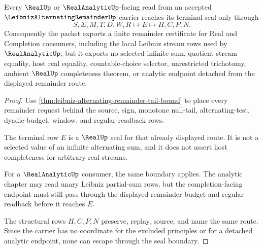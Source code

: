 \begin{theorem}
\label{thm:leibniz-alternating-remainder-real-seal-boundary}
Every $\RealUp$ or $\RealAnalyticUp$-facing read from an accepted $\LeibnizAlternatingRemainderUp$ carrier reaches its terminal seal only through
$$
S,\Sigma,M,T,D,W,R \longmapsto E \longmapsto H,C,P,N .
$$
Consequently the packet exports a finite remainder certificate for Real and Completion consumers, including the local Leibniz stream rows used by $\RealAnalyticUp$, but it exports no selected infinite sum, quotient stream equality, host real equality, countable-choice selector, unrestricted trichotomy, ambient $\RealUp$ completeness theorem, or analytic endpoint detached from the displayed remainder route.
\end{theorem}
\begin{proof}
Use \autoref{thm:leibniz-alternating-remainder-tail-bound} to place every remainder request behind the source, sign, monotone null-tail, alternating-test, dyadic-budget, window, and regular-readback rows.

The terminal row $E$ is a $\RealUp$ seal for that already displayed route. It is not a selected value of an infinite alternating sum, and it does not assert host completeness for arbitrary real streams.

For a $\RealAnalyticUp$ consumer, the same boundary applies. The analytic chapter may read unary Leibniz partial-sum rows, but the completion-facing endpoint must still pass through the displayed remainder budget and regular readback before it reaches $E$.

The structural rows $H,C,P,N$ preserve, replay, source, and name the same route. Since the carrier has no coordinate for the excluded principles or for a detached analytic endpoint, none can escape through the seal boundary.
\end{proof}



